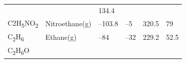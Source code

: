 \documentclass[
]{book}
\theoremstyle{definition}
\theoremstyle{definition}
\theoremstyle{definition}
\theoremstyle{remark}
\begin{document}
\begin{longtable}[]{@{}llllll@{}}
\begin{minipage}[t]{0.15\columnwidth}
\strut
\end{minipage} & \begin{minipage}[t]{0.14\columnwidth}\raggedright
\strut
\end{minipage} & \begin{minipage}[t]{0.14\columnwidth}\raggedright
134.4\strut
\end{minipage}\tabularnewline
\begin{minipage}[t]{0.07\columnwidth}\raggedright
C2H\textsubscript{5}NO\textsubscript{2}\strut
\end{minipage} & \begin{minipage}[t]{0.17\columnwidth}\raggedright
Nitroethane(g)\strut
\end{minipage} & \begin{minipage}[t]{0.15\columnwidth}\raggedright
--103.8\strut
\end{minipage} & \begin{minipage}[t]{0.15\columnwidth}\raggedright
--5\strut
\end{minipage} & \begin{minipage}[t]{0.14\columnwidth}\raggedright
320.5\strut
\end{minipage} & \begin{minipage}[t]{0.14\columnwidth}\raggedright
79\strut
\end{minipage}\tabularnewline
\begin{minipage}[t]{0.07\columnwidth}\raggedright
C\textsubscript{2}H\textsubscript{6}\strut
\end{minipage} & \begin{minipage}[t]{0.17\columnwidth}\raggedright
Ethane(g)\strut
\end{minipage} & \begin{minipage}[t]{0.15\columnwidth}\raggedright
--84\strut
\end{minipage} & \begin{minipage}[t]{0.15\columnwidth}\raggedright
--32\strut
\end{minipage} & \begin{minipage}[t]{0.14\columnwidth}\raggedright
229.2\strut
\end{minipage} & \begin{minipage}[t]{0.14\columnwidth}\raggedright
52.5\strut
\end{minipage}\tabularnewline
\begin{minipage}[t]{0.07\columnwidth}\raggedright
C\textsubscript{2}H\textsubscript{6}O\strut
\end{minipage} & \begin{minipage}[t]{0.17\columnwidth}\raggedright

\end{minipage}
\end{longtable}
\end{document}
